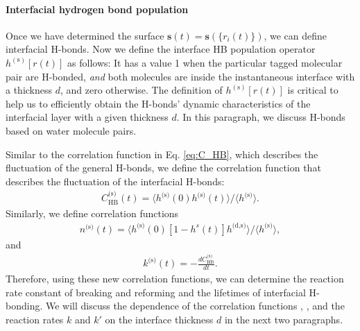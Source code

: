 \FloatBarrier
\paragraph{Interfacial hydrogen bond population} \label{IHBP}
Once we have determined the surface ${\mathbf s}(t)={\mathbf s}(\{{r}_i(t)\})$, we can define interfacial H-bonds.
Now we define the interface HB population operator $h^{(\text{s})}[{r}(t)]$ as follows:
It has a value 1 when the particular tagged molecular pair are H-bonded, \emph{and} both molecules are inside the instantaneous interface 
with a thickness $d$, and zero otherwise. 
The definition of  $h^{(\text{s})}[{r}(t)]$ is critical to help us to efficiently obtain the H-bonds' dynamic characteristics of 
the interfacial layer with a given thickness $d$. %
In this paragraph, we discuss H-bonds based on water molecule pairs. 

Similar to the correlation function \CHB in Eq. \ref{eq:C_HB}, which describes the fluctuation of the general H-bonds,
we define the correlation function \CSHB that describes the fluctuation of the interfacial H-bonds: 
\begin{eqnarray}
C^\text{(s)}_{\text{HB}}(t)=\langle h^\text{(s)}(0)h^\text{(s)}(t) \rangle/\langle h^\text{(s)}\rangle
\label{eq:C_s_HB}.
\end{eqnarray}
%
Similarly, we define correlation functions 
\begin{eqnarray}
n^\text{(s)}(t)=\langle h^\text{(s)}(0)[1-h^s(t)]h^{\text{(d,s)}} \rangle/\langle h^\text{(s)}\rangle
\label{eq:n_s_HB},
\end{eqnarray}
and 
\begin{eqnarray}
k^\text{(s)}(t)= -\frac{dC^\text{(s)}_\text{HB}}{dt}
\label{eq:k_s_HB}.
\end{eqnarray}
Therefore, using these new correlation functions, we can determine the reaction rate constant of breaking and reforming and the lifetimes of interfacial H-bonding.
We will discuss the dependence of the correlation functions \CHB, \CSHB, and the reaction rates $k$ and $k'$ on the interface thickness $d$ in the next two paragraphs.
%
\FloatBarrier

